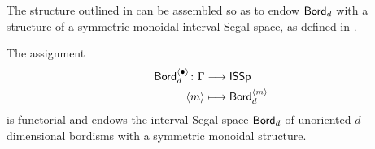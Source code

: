 \nid The structure outlined in  can be assembled so as to endow $\operatorname{\mathsf{Bord}}_d$ with a structure of a symmetric monoidal interval Segal space, as defined in .

\begin{theorem}\label{ch3:: thm: symmetric monoidal}
    The assignment 
    \begin{align}
        \operatorname{\mathsf{Bord}}_{d}^{\langle \bullet \rangle} \colon \Gamma &\longrightarrow \mathsf{ISSp} \\
        \langle m \rangle & \longmapsto \operatorname{\mathsf{Bord}}_d^{\langle m \rangle}
    \end{align}
    is functorial and endows the interval Segal space $\operatorname{\mathsf{Bord}}_d$ of unoriented $d$-dimensional bordisms with a symmetric monoidal structure.
\end{theorem}

